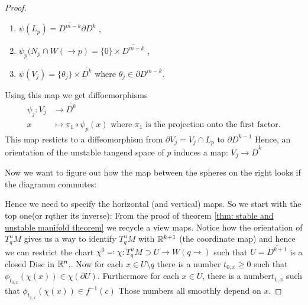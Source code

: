 \begin{proof}
\begin{enumerate}
	\item $\psi(L_p)=\overline{D^{m-k}}\partial D^{k}$ ,
	\item $\psi_p(N_p\cap W(\to p)=\{0\}\times \overline{D^{m-k}}$ ,
	\item $\psi(V_j)=\{\theta_j\} \times \overline{D^{k}} $ where $\theta_j\in \partial D^{m-k}$.
\end{enumerate}
Using this map we get diffoemorphisms 
\begin{align*}
	\psi_j:   V_j &\to \overline{D^{k}}\\
	x             &\mapsto \pi_1\circ \psi_p(x) \text{ where $\pi_1$ is the projection onto the first factor.}
\end{align*} This map resticts to a diffeomorphism from $\partial V_j=V_j\cap L_p$ to $\partial D^{k-1}$ Hence, an orientation of the unstable tangend space of $p$ induces a map:
$V_j\to \overline D^k$

Now we want to figure out how the map between the spheres on the right looks if the diagramm commutes:
\begin{center}
\end{center}
Hence we need to specify the horizontal (and vertical) maps. 
So we start with the top one(or rqther its inverse):
From the proof of theorem \ref{thm: stable and unstable manifold theorem} we recycle a view maps. 
Notice how the orientation of $T^u_qM$ gives us a way to identify $T^u_qM$ with $\mathbb{R}^{k+1}$ (the coordinate map) and hence we can restrict the chart $\chi^0 \eqcolon \chi:T^u_q M\supset U\to W(q\to)$ such that $U=\overline{D^{k+1}}$ is a closed Disc in $\mathbb{R}^n$.. Now for each 
$x\in  U\setminus q$ there is a number $t_{0,x}\geq 0$ such that $\phi_{t_{0,x}}(\chi(x))\in \chi(\partial U)$. Furthermore for each $x\in  U$, there is a number$t_{1,x}$ such that $\phi_{t_{1,x}}(\chi(x))\in f^{-1}(c)$ Those numbers all smoothly depend on $x$.


\end{proof}
